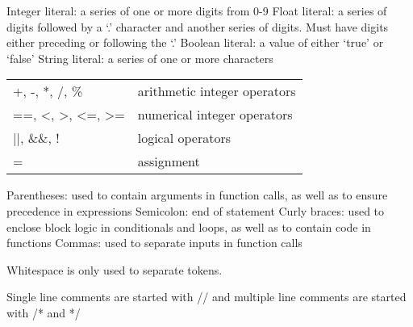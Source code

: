\documentclass{article}
\begin{document}
 \newline
Integer literal: a series of one or more digits from 0-9 \newline
Float literal: a series of digits followed by a ‘.’ character and another series of digits. Must have digits either preceding or following the ‘.’ \newline
Boolean literal: a value of either ‘true’ or ‘false’ \newline
String literal: a series of one or more characters \newline

 \newline
\begin{center}
\begin{tabular}{ l l }
 +, -, *, /, \% & arithmetic integer operators \\ 
 ==, <, >, <=, >= & numerical integer operators \\
 ||, \&\&, ! & logical operators \\
 = & assignment
\end{tabular}
\end{center}

 \newline
Parentheses: used to contain arguments in function calls, as well as to ensure precedence in expressions \newline
Semicolon: end of statement \newline
Curly braces: used to enclose block logic in conditionals and loops, as well as to contain code in functions
Commas: used to separate inputs in function calls \newline

 \newline
Whitespace is only used to separate tokens. \newline

 \newline
Single line comments are started with // and multiple line comments are started with /* and */
\end{document}
